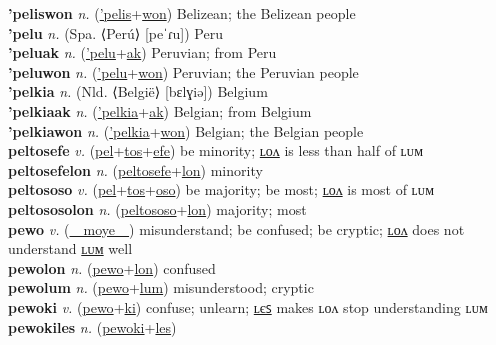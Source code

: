 \textbf{'peliswon} \textit{n.} (\hyperref['pelis]{'pelis}+\hyperref[won]{won})
Belizean; the Belizean people \label{'peliswon} \\
\textbf{'pelu} \textit{n.} (Spa. ⟨Perú⟩ [peˈɾu])
Peru \label{'pelu} \\
\textbf{'peluak} \textit{n.} (\hyperref['pelu]{'pelu}+\hyperref[ak]{ak})
Peruvian; from Peru \label{'peluak} \\
\textbf{'peluwon} \textit{n.} (\hyperref['pelu]{'pelu}+\hyperref[won]{won})
Peruvian; the Peruvian people \label{'peluwon} \\
\textbf{'pelkia} \textit{n.} (Nld. ⟨België⟩ [bɛlɣiə])
Belgium \label{'pelkia} \\
\textbf{'pelkiaak} \textit{n.} (\hyperref['pelkia]{'pelkia}+\hyperref[ak]{ak})
Belgian; from Belgium \label{'pelkiaak} \\
\textbf{'pelkiawon} \textit{n.} (\hyperref['pelkia]{'pelkia}+\hyperref[won]{won})
Belgian; the Belgian people \label{'pelkiawon} \\
\textbf{peltosefe} \textit{v.} (\hyperref[pel]{pel}+\hyperref[tos]{tos}+\hyperref[efe]{efe})
be minority; \hyperref[peltosefelon]{ʟᴏᴧ} is less than half of ʟᴜᴍ \label{peltosefe} \\
\textbf{peltosefelon} \textit{n.} (\hyperref[peltosefe]{peltosefe}+\hyperref[lon]{lon})
minority \label{peltosefelon} \\
\textbf{peltososo} \textit{v.} (\hyperref[pel]{pel}+\hyperref[tos]{tos}+\hyperref[oso]{oso})
be majority; be most; \hyperref[peltososolon]{ʟᴏᴧ} is most of ʟᴜᴍ \label{peltososo} \\
\textbf{peltososolon} \textit{n.} (\hyperref[peltososo]{peltososo}+\hyperref[lon]{lon})
majority; most \label{peltososolon} \\
\textbf{pewo} \textit{v.} (\hyperref[moye]{~~moye~~})
misunderstand; be confused; be cryptic; \hyperref[pewolon]{ʟᴏᴧ} does not understand \hyperref[pewolum]{ʟᴜᴍ} well \label{pewo} \\
\textbf{pewolon} \textit{n.} (\hyperref[pewo]{pewo}+\hyperref[lon]{lon})
confused \label{pewolon} \\
\textbf{pewolum} \textit{n.} (\hyperref[pewo]{pewo}+\hyperref[lum]{lum})
misunderstood; cryptic \label{pewolum} \\
\textbf{pewoki} \textit{v.} (\hyperref[pewo]{pewo}+\hyperref[ki]{ki})
confuse; unlearn; \hyperref[pewokiles]{ʟєꜱ} makes ʟᴏᴧ stop understanding ʟᴜᴍ \label{pewoki} \\
\textbf{pewokiles} \textit{n.} (\hyperref[pewoki]{pewoki}+\hyperref[les]{les})

